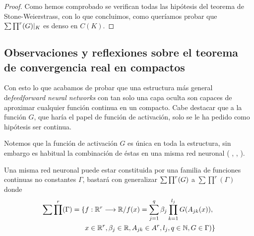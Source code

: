 \begin{proof}
    Como hemos comprobado se verifican todas las hipótesis del teorema de Stone-Weierstrass, con lo que concluimos, como queríamos probar que $\sum \prod^r (G) |_K$ es denso en $C(K).$ 

\end{proof}

\subsection{Observaciones y reflexiones sobre el teorema de convergencia real en compactos}

Con esto lo que acabamos de probar que una estructura más general de\textit{feedforward neural networks} con tan solo una capa oculta  son capaces de aproximar cualquier 
función continua en un compacto.  Cabe destacar que a la función $G$, que haría el papel de función de activación,
 solo se le ha pedido como 
hipótesis ser continua.     


Notemos que la función de activación $G$ es única en toda la estructura,
sin embargo es habitual la combinación de éstas en una misma red neuronal (
\cite{DBLP:journals/corr/abs-1811-03378}, 
 \cite{8258768}, 
 \cite{DBLP:journals/corr/SzegedyVISW15}
). 

\begin{corolario} \label{cor:se-generaliza-G-a-una-familia}

    Una misma red neuronal puede estar constituida por una familia de funciones continuas no constantes $\Gamma$, 
    bastará con generalizar $\sum \prod^r (G)$ a $\sum \prod ^r (\Gamma)$ donde 
    \begin{equation}
        \begin{split}
            \sum \prod^r (\Gamma) = \{ 
                &f: \mathbb{R}^r \longrightarrow \mathbb{R} /
                f(x) = \sum_{j = 1} ^q  \beta_j \prod_{k=1}^{l_j}
                G(A_{jk}(x)), \\
                &x  \in \mathbb{R}^r, \beta_j \in \mathbb{R}, A_{jk}\in A^r, l_j,q \in \mathbb{N}, G \in \Gamma
                )
                \}
        \end{split}
    \end{equation}
\end{corolario}

